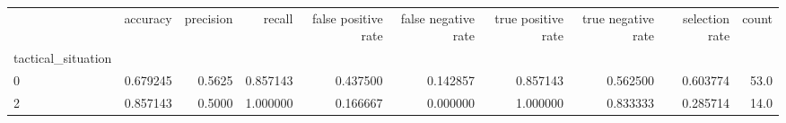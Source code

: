 \begin{tabular}{lrrrrrrrrr}
\toprule
{} &  accuracy &  precision &    recall &  false positive rate &  false negative rate &  true positive rate &  true negative rate &  selection rate &  count \\
tactical\_situation &           &            &           &                      &                      &                     &                     &                 &        \\
\midrule
0                  &  0.679245 &     0.5625 &  0.857143 &             0.437500 &             0.142857 &            0.857143 &            0.562500 &        0.603774 &   53.0 \\
2                  &  0.857143 &     0.5000 &  1.000000 &             0.166667 &             0.000000 &            1.000000 &            0.833333 &        0.285714 &   14.0 \\
\bottomrule
\end{tabular}
